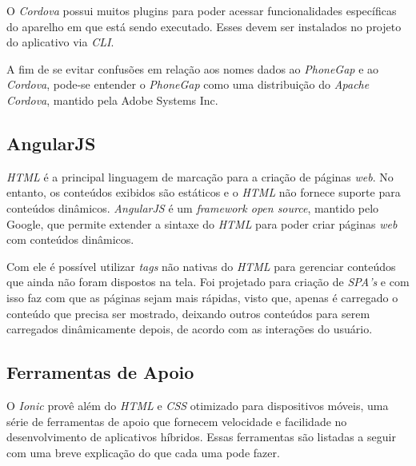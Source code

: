 O \textit{Cordova} possui muitos plugins para poder acessar funcionalidades específicas do aparelho em que está sendo 
executado. Esses devem ser instalados no projeto do aplicativo via \textit{CLI}. 

A fim de se evitar confusões em relação aos nomes dados ao \textit{PhoneGap} e ao \textit{Cordova}, pode-se entender o \textit{PhoneGap} 
como uma distribuição do \textit{Apache Cordova}, mantido pela Adobe Systems Inc. 


\subsection{AngularJS} \label{subsec:angularjs}

\textit{HTML} é a principal linguagem de marcação para a criação de páginas \textit{web}. No entanto, os conteúdos exibidos são estáticos e o \textit{HTML} não fornece suporte para conteúdos dinâmicos.
\textit{AngularJS} é um \textit{framework open source}, mantido pelo Google, que permite extender a sintaxe do \textit{HTML} para poder criar páginas \textit{web} com conteúdos dinâmicos.


Com ele é possível utilizar \textit{tags} não nativas do \textit{HTML} para gerenciar conteúdos que ainda não foram dispostos na tela. 
Foi projetado para criação de \textit{SPA's} e com isso faz com que as páginas sejam mais rápidas, visto que, apenas é carregado o conteúdo que precisa ser mostrado, 
deixando outros conteúdos para serem carregados dinâmicamente depois, de acordo com as interações do usuário.    

\subsection{Ferramentas de Apoio} \label{subsec:ferramentasapoio}

O \textit{Ionic} provê além do \textit{HTML} e \textit{CSS} otimizado para dispositivos móveis, uma série de ferramentas de 
apoio que fornecem velocidade e facilidade no desenvolvimento de aplicativos híbridos. Essas ferramentas são listadas a seguir 
com uma breve explicação do que cada uma pode fazer.

